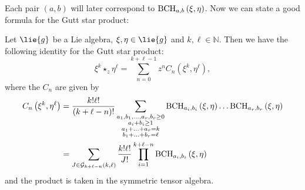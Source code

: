 Each pair $(a,b)$ will later correspond to $\mathrm{BCH}_{a, b}\left(\xi, \eta\right)$.
Now we can state a good formula for the Gutt star product:
\begin{lemma}
	\label{Lemma:Formulas:2MonomialsFormula1}
	Let $\lie{g}$ be a Lie algebra, $\xi, \eta \in \lie{g}$ and $k, 
	\ell \in \mathbb{N}$. Then we have the following identity for the 
	Gutt star product:
	\begin{equation*}
    	\xi^k \star_z \eta^{\ell}
    	=
	    \sum\limits_{n=0}^{k + \ell -1}
    	z^n
    	C_n \left( \xi^k, \eta^{\ell} \right),
	\end{equation*}
	where the $C_n$ are given by
	\begin{align}
		\label{Formulas:2MonomialsExplicit}
        C_n \left( \xi^k, \eta^{\ell} \right)
        & =
        \frac{k! \ell!}{(k + \ell - n)!}
        \sum\limits_{\substack{a_1, b_1, \ldots, a_r, b_r \geq 0 \\
            a_i + b_i \geq 1 \\
            a_1 + \ldots + a_r = k \\
            b_1 + \ldots + b_r = \ell
        }}
        \mathrm{BCH}_{a_i, b_i}\left(\xi, \eta\right)
        \ldots
        \mathrm{BCH}_{a_r, b_r}\left(\xi, \eta\right)
        \\
        \label{Formulas:2MonomialsFormula1}
        & =
        \sum\limits_{J \in \mathcal{G}_{k + \ell - n}(k, \ell)}
        \frac{k! \ell!}{J!}
        \prod\limits_{i = 1}^{k + \ell - n}        
        \mathrm{BCH}_{a_i, b_i}\left(\xi, \eta\right)
	\end{align}
	and the product is taken in the symmetric tensor algebra.
\end{lemma}
